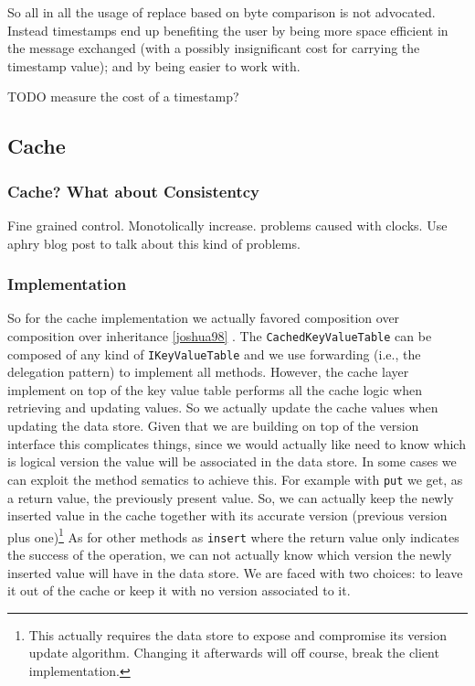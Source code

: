 So all in all
the usage of replace based on byte comparison is not
advocated. Instead timestamps end up benefiting the user by being more
space efficient in the message exchanged (with a possibly
insignificant cost for carrying the timestamp value); and by being
easier to work with. 


TODO measure the cost of a timestamp? 
\subsection{Cache}
\subsubsection{Cache? What about Consistentcy}
Fine grained control. 
Monotolically increase. problems caused with clocks. Use aphry blog
post to talk about this kind of problems. 

\subsubsection{Implementation}
So for the cache implementation we actually favored composition over
composition over inheritance \ref{joshua98}  . The
\texttt{CachedKeyValueTable} can be composed of any kind of
\texttt{IKeyValueTable} and we use forwarding (i.e., the delegation
pattern) to implement all methods. However, the cache layer implement
on top of the key value table performs all the cache logic when
retrieving and updating values. So we actually update the cache values
when updating the data store. Given that we are building on top of the
version interface this complicates things, since we would actually
like need to know which is logical version the value will be
associated in the data store. In some cases we can exploit the
method sematics to achieve this. For example with \texttt{put} we get,
as a return value, the previously present value. So, we can actually
keep the newly inserted value in the cache together with its accurate
version (previous version plus one)\footnote{This actually requires
  the data store to expose and compromise its version update
  algorithm. Changing it afterwards will off course, break the client
  implementation. } As for other methods as \texttt{insert} where the
return value only indicates the success of the operation, we can not
actually know which version the newly inserted value will have in the
data store. We are faced with two choices: to leave it out of the
cache or keep it with no version associated to it.  

